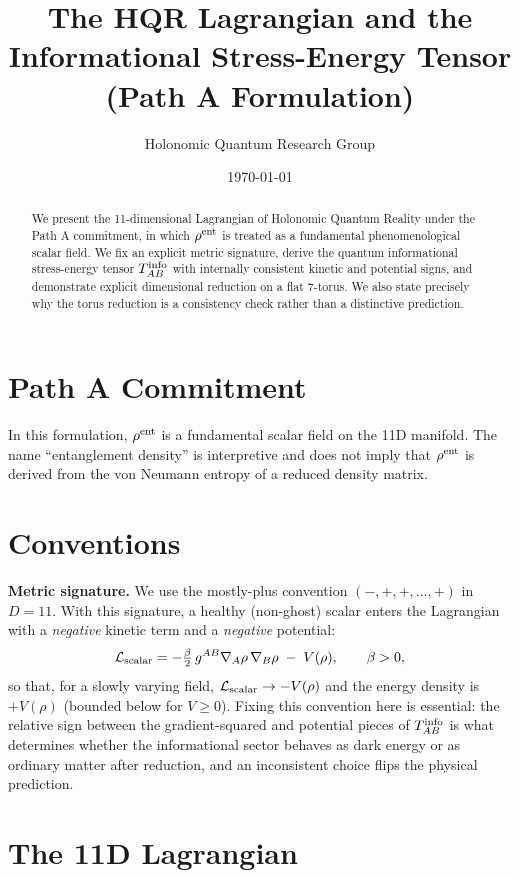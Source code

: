 \documentclass[11pt,a4paper]{article}
\title{The HQR Lagrangian and the Informational Stress-Energy Tensor \\ (Path A Formulation)}
\author{Holonomic Quantum Research Group}
\date{\today}
\begin{document}
\maketitle

\begin{abstract}
We present the 11-dimensional Lagrangian of Holonomic Quantum Reality under the
Path A commitment, in which \(\rho^{\rm ent}\) is treated as a fundamental
phenomenological scalar field. We fix an explicit metric signature, derive the
quantum informational stress-energy tensor \(T^{\rm info}_{AB}\) with internally
consistent kinetic and potential signs, and demonstrate explicit dimensional
reduction on a flat 7-torus. We also state precisely why the torus reduction is
a consistency check rather than a distinctive prediction.
\end{abstract}

\section{Path A Commitment}

In this formulation, \(\rho^{\rm ent}\) is a fundamental scalar field on the 11D
manifold. The name ``entanglement density'' is interpretive and does not imply
that \(\rho^{\rm ent}\) is derived from the von Neumann entropy of a reduced
density matrix.

\section{Conventions}

\textbf{Metric signature.} We use the mostly-plus convention
\((-,+,+,\dots,+)\) in \(D=11\). With this signature, a healthy (non-ghost)
scalar enters the Lagrangian with a \emph{negative} kinetic term and a
\emph{negative} potential:
\[
\mathcal{L}_{\rm scalar}
= -\tfrac{\beta}{2}\, g^{AB}\nabla_A\rho\,\nabla_B\rho \;-\; V(\rho),
\qquad \beta>0,
\]
so that, for a slowly varying field, \(\mathcal{L}_{\rm scalar}\to -V(\rho)\)
and the energy density is \(+V(\rho)\) (bounded below for \(V\ge 0\)). Fixing
this convention here is essential: the relative sign between the
gradient-squared and potential pieces of \(T^{\rm info}_{AB}\) is what
determines whether the informational sector behaves as dark energy or as
ordinary matter after reduction, and an inconsistent choice flips the physical
prediction.

\section{The 11D Lagrangian}
\end{document}
